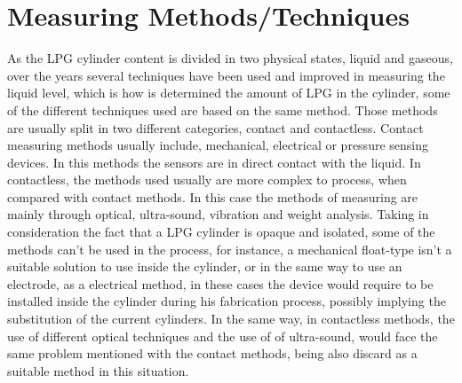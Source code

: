 
\section{Measuring Methods/Techniques}
As the LPG cylinder content is divided in two physical states, liquid and gaseous, over the years several techniques have been used and improved in measuring the liquid level, which is how is determined the amount of LPG in the cylinder, some of the different techniques used are based on the same method. Those methods are usually split in two different categories, contact and contactless. Contact measuring methods usually include, mechanical, electrical or pressure sensing devices. In this methods the sensors are in direct contact with the liquid. In contactless, the methods used usually are more complex to process, when compared with contact methods. In this case the methods of measuring are mainly through optical, ultra-sound, vibration and weight analysis\cite{nakagawaContactlessLiquidLevelMeasurement2013a}. 
Taking in consideration the fact that a LPG cylinder is opaque and isolated, some of the methods can't be used in the process, for instance, a mechanical float-type isn't a suitable solution to use inside the cylinder, or in the same way to use an electrode, as a electrical method, in these cases the device would require to be installed inside the cylinder during his fabrication process, possibly implying the substitution of the current cylinders. In the same way, in contactless methods, the use of different optical techniques and the use of of ultra-sound, would face the same problem mentioned with the contact methods, being also discard as a suitable method in this situation. 

